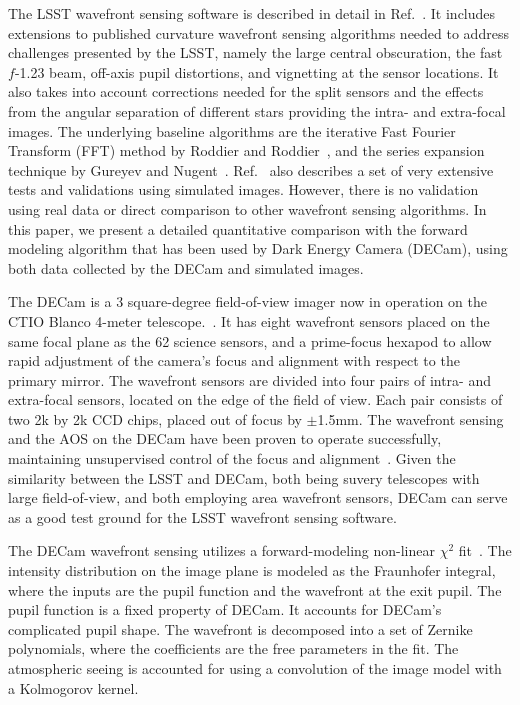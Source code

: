 \documentclass[]{spie}  %
\begin{document}
The LSST wavefront sensing software is described in detail in Ref.~.
It includes extensions to published curvature wavefront sensing algorithms needed
to address challenges presented by the LSST, namely the large central
obscuration, the fast $f$-1.23 beam, off-axis pupil distortions, and vignetting
at the sensor locations. It also takes into account corrections needed for the
split sensors and the effects from the angular separation of different
stars providing the intra- and extra-focal images.
The underlying baseline algorithms are the iterative Fast Fourier 
Transform (FFT) method by Roddier and Roddier~\cite{Roddier93}, and
the series expansion technique by Gureyev and Nugent~\cite{GuNu96}.
Ref.~ also describes a set of very extensive tests and validations using simulated images.
However, there is no validation using real data or direct comparison to other wavefront sensing algorithms. In this paper, we present a detailed quantitative comparison with the forward modeling algorithm that has been used by Dark Energy Camera (DECam), using both data collected by the DECam and simulated images.

The DECam is a 3 square-degree field-of-view imager now in operation on the CTIO Blanco 4-meter telescope.~\cite{DECamStatus}. It has eight wavefront sensors placed on the same focal plane as the 62 science sensors, and a prime-focus hexapod to allow rapid adjustment of the camera's focus and alignment with respect to the primary mirror.
The wavefront sensors are divided into four pairs of intra- and extra-focal sensors, located on the edge of the field of view. Each pair consists of two 2k by 2k CCD chips, placed out of focus by $\pm$1.5mm.
The wavefront sensing and the AOS on the DECam have been proven to operate successfully, maintaining unsupervised control of the focus and alignment~\cite{roodman14}.
Given the similarity between the LSST and DECam, both being suvery telescopes with large field-of-view, and both employing area wavefront sensors, DECam can serve as a good test ground for the LSST wavefront sensing software. 

The DECam wavefront sensing utilizes a forward-modeling non-linear $\chi^2$ fit~\cite{roodman14}. The intensity distribution on the image plane is modeled as the Fraunhofer integral, where the inputs are the pupil function and the wavefront at the exit pupil. The pupil function is a fixed property of DECam. It accounts for DECam's complicated pupil shape. The wavefront is decomposed into a set of Zernike polynomials, where the coefficients are the free parameters in the fit. The atmospheric seeing is accounted for using a convolution of the image model with a Kolmogorov kernel.
\end{document}
